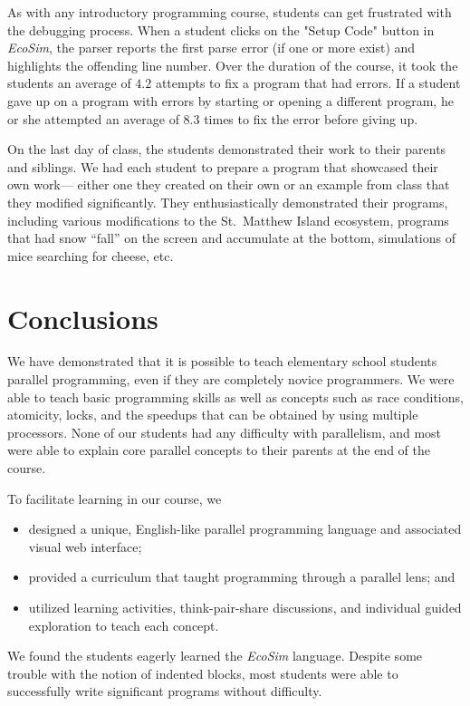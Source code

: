 \documentclass{sig-alternate}
\newcommand{\FIXME}[1]{{\color{red}\{FIXME #1\}}}
\newcommand{\EcoSim}{\emph{EcoSim}}
\begin{document}
As with any introductory programming course, students can get frustrated with the debugging
process.  When a student clicks on the "Setup Code" button in \emph{EcoSim}, the parser reports
the first parse error (if one or more exist) and highlights the offending line number.  Over the
duration of the course, it took the students an average of $4.2$ attempts to fix a program that
had errors.  If a student gave up on a program with errors by starting or opening a different
program, he or she attempted an average of $8.3$ times to fix the error before giving up.


On the last day of class, the students demonstrated their work to their parents and siblings. 
We had each student to prepare a program that showcased their own work---%
either one they created on their own or an example from class that they modified significantly.
They enthusiastically demonstrated their programs,
including various modifications to the St.~Matthew Island ecosystem,
programs that had snow ``fall'' on the screen and accumulate at the bottom,
simulations of mice searching for cheese,
etc.

\section{Conclusions}
We have demonstrated that it is possible to teach elementary school students parallel programming,
even if they are completely novice programmers. 
We were able to teach basic programming skills as well as concepts such as race conditions, 
atomicity, locks, and the speedups that can be obtained by using multiple processors.
None of our students had any difficulty with parallelism, 
and most were able to explain core parallel concepts to their parents at the end of the course.

To facilitate learning in our course, we
\begin{itemize}\itemsep=0pt \topsep=0pt
\item designed a unique, English-like parallel programming language and associated visual web interface;
\item provided a curriculum that taught programming through a parallel lens; and
\item utilized learning activities, think-pair-share discussions, and individual guided exploration to teach each concept.
\end{itemize}
We found the students eagerly learned the \EcoSim{} language.
Despite some trouble with the notion of indented blocks,
most students were able to successfully write significant programs without difficulty.  
\end{document}
